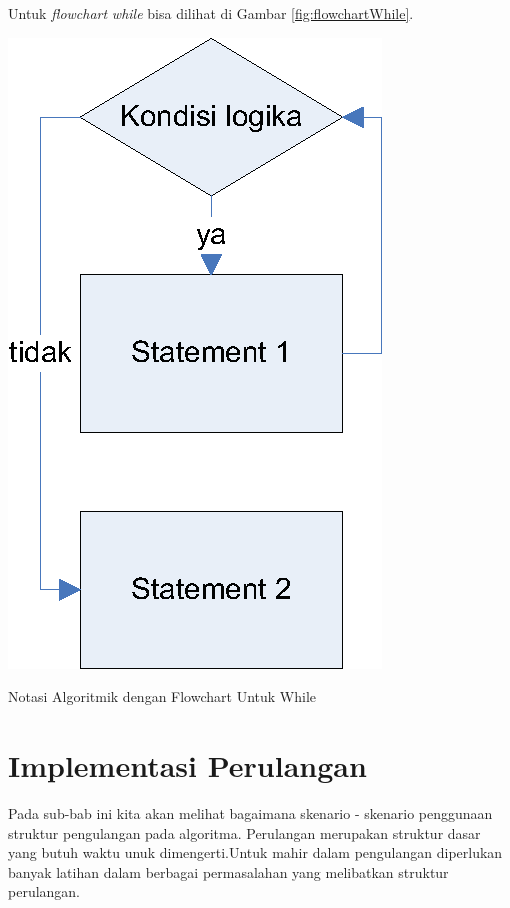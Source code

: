Untuk \textit{flowchart} \textit{while} bisa dilihat di Gambar \ref{fig:flowchartWhile}.
\begin{marginfigure}[3cm]%
\centering
\includegraphics[scale=0.6]{fig/flowchart-WHILE.eps}%
\caption{\Centering Notasi Algoritmik dengan Flowchart Untuk While}%
\label{fig:flowchartWhile}%
\end{marginfigure}


\section{Implementasi Perulangan}
Pada sub-bab ini kita akan melihat bagaimana skenario - skenario penggunaan struktur pengulangan pada algoritma. Perulangan merupakan struktur dasar yang butuh waktu unuk dimengerti.Untuk mahir dalam pengulangan diperlukan banyak latihan dalam berbagai permasalahan yang melibatkan struktur perulangan.

